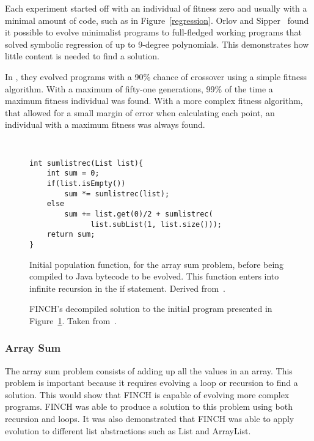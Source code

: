 \documentclass{sig-alternate}
\begin{document}
Each experiment started off with an individual of fitness zero and usually with a minimal amount of code, such as in Figure~\ref{regression}. Orlov and Sipper~\cite{FINCH:2011} found it possible  to evolve minimalist programs to full-fledged working programs that solved symbolic regression of up to 9-degree polynomials. This demonstrates how little content is needed to find a solution.\par

In \cite{FINCH:2011}, they evolved programs with a 90\% chance of crossover using a simple fitness algorithm. With a maximum of fifty-one generations, 99\% of the time a maximum fitness individual was found. With a more complex fitness algorithm, that allowed for a small margin of error when calculating each point, an individual with a maximum fitness was always found. 

\begin{figure}
\centering
{\tt
\begin{verbatim}
int sumlistrec(List list){
    int sum = 0;
    if(list.isEmpty())
        sum *= sumlistrec(list);
    else
        sum += list.get(0)/2 + sumlistrec(
              list.subList(1, list.size()));
    return sum;
}
\end{verbatim}
}

\caption{Initial population function, for the array sum problem, before being compiled to Java bytecode to be evolved. This function enters into infinite recursion in the if statement. Derived from~\cite{FINCH:2011}.}
\label{initial rec}
\end{figure}

\begin{figure}
\centering
{}
\caption{FINCH's decompiled solution to the initial program presented in Figure~\ref{initial rec}. Taken from~\cite{FINCH:2011}.}
\label{final rec}
\end{figure}

\subsubsection{Array Sum}
The array sum problem consists of adding up all the values in an array. This problem is important because it requires evolving a loop or recursion to find a solution. This would show that FINCH is capable of evolving more complex programs. FINCH was able to produce a solution to this problem using both recursion and loops. It was also demonstrated that FINCH was able to apply evolution to different list abstractions such as List and ArrayList.
\end{document}
